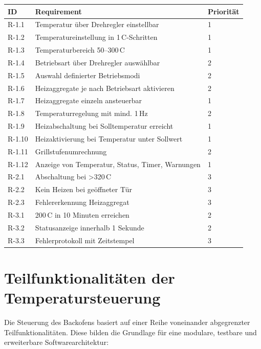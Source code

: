 \documentclass[a4paper,12pt]{article}
\begin{document}
\begin{tabular}{|l|l|l|}
\hline
\textbf{ID} & \textbf{Requirement} & \textbf{Priorität} \\
\hline
R-1.1  & Temperatur über Drehregler einstellbar & 1 \\
\hline
R-1.2  & Temperatureinstellung in 1\,\textdegree{}C-Schritten & 1 \\
\hline
R-1.3  & Temperaturbereich 50–300\,\textdegree{}C          & 1 \\
\hline
R-1.4  & Betriebsart über Drehregler auswählbar           & 2 \\
\hline
R-1.5  & Auswahl definierter Betriebsmodi                 & 2 \\
\hline
R-1.6  & Heizaggregate je nach Betriebsart aktivieren     & 2 \\
\hline
R-1.7  & Heizaggregate einzeln ansteuerbar                & 1 \\
\hline
R-1.8  & Temperaturregelung mit mind. 1\,Hz                & 2 \\
\hline
R-1.9  & Heizabschaltung bei Solltemperatur erreicht      & 1 \\
\hline
R-1.10 & Heizaktivierung bei Temperatur unter Sollwert    & 1 \\
\hline
R-1.11 & Grillstufenumrechnung                            & 2 \\
\hline
R-1.12 & Anzeige von Temperatur, Status, Timer, Warnungen & 1 \\
\hline
R-2.1  & Abschaltung bei >320\,\textdegree{}C              & 3 \\
\hline
R-2.2  & Kein Heizen bei geöffneter Tür                   & 3 \\
\hline
R-2.3  & Fehlererkennung Heizaggregat                     & 3 \\
\hline
R-3.1  & 200\,\textdegree{}C in 10 Minuten erreichen       & 2 \\
\hline
R-3.2  & Statusanzeige innerhalb 1 Sekunde                & 2 \\
\hline
R-3.3  & Fehlerprotokoll mit Zeitstempel                  & 3 \\
\hline
\end{tabular}

\newpage

\section{Teilfunktionalitäten der Temperatursteuerung}

Die Steuerung des Backofens basiert auf einer Reihe voneinander abgegrenzter Teilfunktionalitäten. Diese bilden die Grundlage für eine modulare, testbare und erweiterbare Softwarearchitektur:
\end{document}

